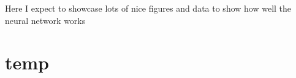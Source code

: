 
Here I expect to showcase lots of nice figures and data to show how well the neural network works

\section{temp}

